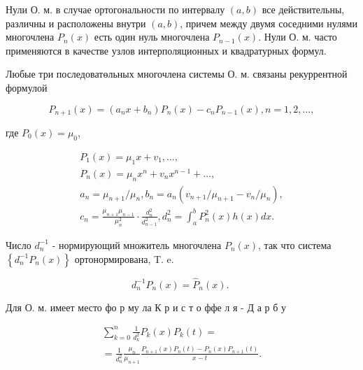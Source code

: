 \documentclass[10pt]{article}
\begin{document}
Нули О. м. в случае ортогональности по интервалу $(a, b)$ все действительны, различны и расположены внутри $(a, b)$, причем между двумя соседними нулями многочлена $P_{n}(x)$ есть один нуль многочлена $P_{n-1}(x)$. Нули О. м. часто применяются в качестве узлов интерполяционных и квадратурных формул.



Любые три последоватөльных многочлена системы О. м. связаны рекуррентной формулой



\[

P_{n+1}(x)=\left(a_{n} x+b_{n}\right) P_{n}(x)-c_{n} P_{n-1}(x), n=1,2, \ldots,

\]



где $P_{0}(x)=\mu_{0}$,



\[

\begin{gathered}

P_{1}(x)=\mu_{1} x+v_{1}, \ldots, \\

P_{n}(x)=\mu_{n} x^{n}+v_{n} x^{n-1}+\ldots, \\

a_{n}=\mu_{n+1} / \mu_{n}, b_{n}=a_{n}\left(v_{n+1} / \mu_{n+1}-v_{n} / \mu_{n}\right), \\

c_{n}=\frac{\mu_{n+1} \mu_{n-1}}{\mu_{n}^{2}} \cdot \frac{d_{n}^{2}}{d_{n-1}^{2}}, d_{n}^{2}=\int_{a}^{b} P_{n}^{2}(x) h(x) d x .

\end{gathered}

\]



Число $d_{n}^{-1}$ - нормирующий множитель многочлена $P_{n}(x)$, так что система $\left\{d_{n}^{-1} P_{n}(x)\right\}$ ортонормирована, T. e.



\[

d_{n}^{-1} P_{n}(x)=\hat{P}_{n}(x) \text {. }

\]



Для О. м. имеет место фо р му ла К р и с т о ффе л я - Д а р б у



\[

\begin{gathered}

\sum_{k=0}^{n} \frac{1}{d_{k}^{2}} P_{k}(x) P_{k}(t)= \\

=\frac{1}{d_{n}^{2}} \frac{\mu_{n}}{\mu_{n+1}} \frac{P_{n+1}(x) P_{n}(t)-P_{n}(x) P_{n+1}(t)}{x-t} .

\end{gathered}

\]
\end{document}
